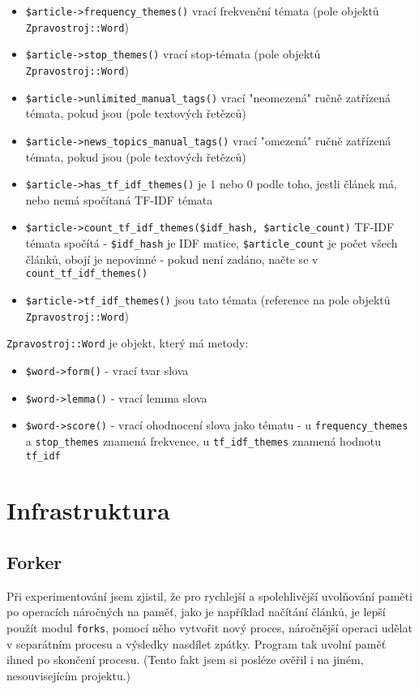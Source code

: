 \documentclass[12pt,a4paper]{report}
\begin{document}
\begin{itemize}
	\item \texttt{\$article->frequency\_themes()} vrací frekvenční témata (pole objektů \texttt{Zpravostroj::Word})
	\item \texttt{\$article->stop\_themes()} vrací stop-témata (pole objektů \texttt{Zpravostroj::Word})
	\item \texttt{\$article->unlimited\_manual\_tags()} vrací "neomezená" ručně zatřízená témata, pokud jsou (pole textových řetězců)
	\item \texttt{\$article->news\_topics\_manual\_tags()} vrací "omezená" ručně zatřízená témata, pokud jsou (pole textových řetězců)
	\item \texttt{\$article->has\_tf\_idf\_themes()} je 1 nebo 0 podle toho, jestli článek má, nebo nemá spočítaná TF-IDF témata
	\item \texttt{\$article->count\_tf\_idf\_themes(\$idf\_hash, \$article\_count)} TF-IDF témata spočítá - \texttt{\$idf\_hash} je IDF matice, \texttt{\$article\_count} je počet všech článků, obojí je nepovinné - pokud není zadáno, načte se v \texttt{count\_tf\_idf\_themes()}
	\item \texttt{\$article->tf\_idf\_themes()} jsou tato témata (reference na pole objektů \texttt{Zpravostroj::Word})
\end{itemize}
	
\texttt{Zpravostroj::Word} je objekt, který má metody:
\begin{itemize}
	\item \texttt{\$word->form()} - vrací tvar slova
	\item \texttt{\$word->lemma()} - vrací lemma slova
	\item \texttt{\$word->score()} - vrací ohodnocení slova jako tématu - u \texttt{frequency\_themes} a \texttt{stop\_themes} znamená frekvence, u \texttt{tf\_idf\_themes} znamená hodnotu \texttt{tf\_idf}
\end{itemize}

\section{Infrastruktura}
				
\subsection{Forker}
\label{sec:forker}
Při experimentování jsem zjistil, že pro rychlejší a spolehlivější uvolňování paměti po operacích náročných na paměť, jako je například načítání článků, je lepší použít modul \texttt{forks}, pomocí něho vytvořit nový proces, náročnější operaci udělat v separátním procesu a výsledky nasdílet zpátky. Program tak uvolní paměť ihned po skončení procesu. (Tento fakt jsem si posléze ověřil i na jiném, nesouvisejícím projektu.)
\end{document}
